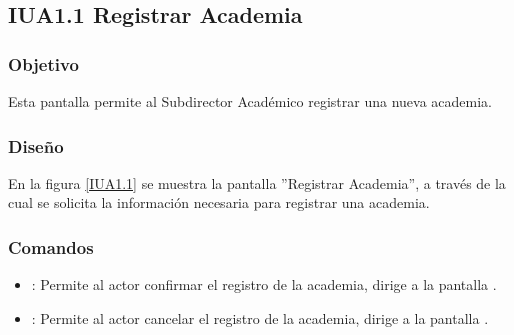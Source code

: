 \subsection{IUA1.1 Registrar Academia}

\subsubsection{Objetivo}
	Esta pantalla permite al Subdirector Académico registrar una nueva academia.

\subsubsection{Diseño}

    En la figura \ref{IUA1.1} se muestra la pantalla ''Registrar Academia'', a través de la cual se solicita la información necesaria para registrar una academia.
 

\subsubsection{Comandos}
    \begin{itemize}
	\item {}: Permite al actor confirmar el registro de la academia, dirige a la pantalla .
	
	\item {}: Permite al actor cancelar el registro de la academia, dirige a la pantalla .
    \end{itemize}
